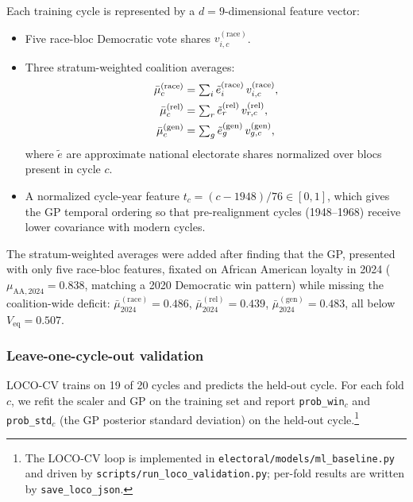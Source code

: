 \documentclass[12pt, letterpaper]{article}
\theoremstyle{definition}
\newcommand{\Veq}{V_{\mathrm{eq}}}
\begin{document}
Each training cycle is represented by a $d = 9$-dimensional feature vector:
\begin{itemize}
  \item Five race-bloc Democratic vote shares $v_{i,c}^{(\text{race})}$.
  \item Three stratum-weighted coalition averages:
    \begin{align}
      \bar{\mu}_c^{(\text{race})} &=
        \textstyle\sum_i \tilde{e}_i^{(\text{race})} \, v_{i,c}^{(\text{race})},
      \label{eq:murace} \\
      \bar{\mu}_c^{(\text{rel})} &=
        \textstyle\sum_r \tilde{e}_r^{(\text{rel})} \, v_{r,c}^{(\text{rel})},
      \notag \\
      \bar{\mu}_c^{(\text{gen})} &=
        \textstyle\sum_g \tilde{e}_g^{(\text{gen})} \, v_{g,c}^{(\text{gen})},
      \notag
    \end{align}
    where $\tilde{e}$ are approximate national electorate shares normalized
    over blocs present in cycle $c$.
  \item A normalized cycle-year feature $t_c = (c - 1948) / 76 \in [0, 1]$,
        which gives the GP temporal ordering so that pre-realignment cycles
        (1948--1968) receive lower covariance with modern cycles.
\end{itemize}

The stratum-weighted averages were added after finding that the GP, presented
with only five race-bloc features, fixated on African American loyalty in 2024
($\mu_{\text{AA},2024} = 0.838$, matching a 2020 Democratic win pattern) while
missing the coalition-wide deficit: $\bar{\mu}_{2024}^{(\text{race})} = 0.486$,
$\bar{\mu}_{2024}^{(\text{rel})} = 0.439$, $\bar{\mu}_{2024}^{(\text{gen})} = 0.483$,
all below $\Veq = 0.507$.

\subsubsection{Leave-one-cycle-out validation}
\label{sec:loco}

LOCO-CV trains on 19 of 20 cycles and predicts the held-out cycle. For each
fold $c$, we refit the scaler and GP on the training set and report
\texttt{prob\_win}$_c$ and \texttt{prob\_std}$_c$ (the GP posterior standard
deviation) on the held-out cycle.\footnote{The LOCO-CV loop is implemented in
\texttt{electoral/models/ml\_baseline.py} and driven by
\texttt{scripts/run\_loco\_validation.py}; per-fold results are written by
\texttt{save\_loco\_json}.}
\end{document}
